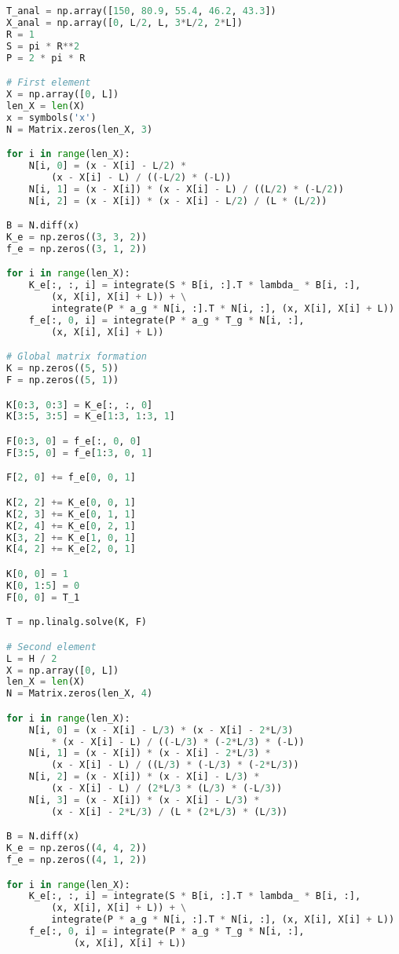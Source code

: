 \documentclass[a4paper, 12pt]{article}
\begin{document}
\begin{enumerate}
\begin{lstlisting}[language=Python]
T_anal = np.array([150, 80.9, 55.4, 46.2, 43.3])
X_anal = np.array([0, L/2, L, 3*L/2, 2*L])
R = 1
S = pi * R**2
P = 2 * pi * R

# First element
X = np.array([0, L])
len_X = len(X)
x = symbols('x')
N = Matrix.zeros(len_X, 3)

for i in range(len_X):
    N[i, 0] = (x - X[i] - L/2) * 
        (x - X[i] - L) / ((-L/2) * (-L))
    N[i, 1] = (x - X[i]) * (x - X[i] - L) / ((L/2) * (-L/2))
    N[i, 2] = (x - X[i]) * (x - X[i] - L/2) / (L * (L/2))

B = N.diff(x)
K_e = np.zeros((3, 3, 2))
f_e = np.zeros((3, 1, 2))

for i in range(len_X):
    K_e[:, :, i] = integrate(S * B[i, :].T * lambda_ * B[i, :], 
        (x, X[i], X[i] + L)) + \
        integrate(P * a_g * N[i, :].T * N[i, :], (x, X[i], X[i] + L))
    f_e[:, 0, i] = integrate(P * a_g * T_g * N[i, :], 
        (x, X[i], X[i] + L))

# Global matrix formation
K = np.zeros((5, 5))
F = np.zeros((5, 1))

K[0:3, 0:3] = K_e[:, :, 0]
K[3:5, 3:5] = K_e[1:3, 1:3, 1]

F[0:3, 0] = f_e[:, 0, 0]
F[3:5, 0] = f_e[1:3, 0, 1]

F[2, 0] += f_e[0, 0, 1]

K[2, 2] += K_e[0, 0, 1]
K[2, 3] += K_e[0, 1, 1]
K[2, 4] += K_e[0, 2, 1]
K[3, 2] += K_e[1, 0, 1]
K[4, 2] += K_e[2, 0, 1]

K[0, 0] = 1
K[0, 1:5] = 0
F[0, 0] = T_1

T = np.linalg.solve(K, F)

# Second element
L = H / 2
X = np.array([0, L])
len_X = len(X)
N = Matrix.zeros(len_X, 4)

for i in range(len_X):
    N[i, 0] = (x - X[i] - L/3) * (x - X[i] - 2*L/3) 
        * (x - X[i] - L) / ((-L/3) * (-2*L/3) * (-L))
    N[i, 1] = (x - X[i]) * (x - X[i] - 2*L/3) * 
        (x - X[i] - L) / ((L/3) * (-L/3) * (-2*L/3))
    N[i, 2] = (x - X[i]) * (x - X[i] - L/3) * 
        (x - X[i] - L) / (2*L/3 * (L/3) * (-L/3))
    N[i, 3] = (x - X[i]) * (x - X[i] - L/3) * 
        (x - X[i] - 2*L/3) / (L * (2*L/3) * (L/3))

B = N.diff(x)
K_e = np.zeros((4, 4, 2))
f_e = np.zeros((4, 1, 2))

for i in range(len_X):
    K_e[:, :, i] = integrate(S * B[i, :].T * lambda_ * B[i, :], 
        (x, X[i], X[i] + L)) + \
        integrate(P * a_g * N[i, :].T * N[i, :], (x, X[i], X[i] + L))
    f_e[:, 0, i] = integrate(P * a_g * T_g * N[i, :], 
            (x, X[i], X[i] + L))


\end{lstlisting}
\end{enumerate}
\end{document}
